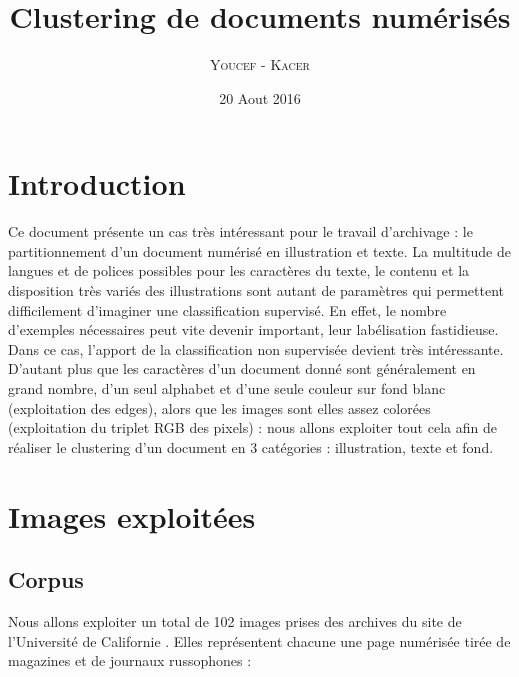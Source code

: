 \documentclass{book}
\title{Clustering de documents numérisés}
\author{\textsc{Youcef} - \textsc{Kacer}}
\date{20 Aout 2016}
\begin{document}
 
\maketitle

\tableofcontents

\frontmatter
\chapter{Introduction}
Ce document présente un cas très intéressant pour le travail d'archivage : le partitionnement d'un document numérisé en illustration et texte.
La multitude de langues et de polices possibles pour les caractères du texte, le contenu et la disposition très variés des illustrations sont 
autant de paramètres qui permettent difficilement d'imaginer une classification supervisé. En effet, le nombre d'exemples nécessaires peut vite devenir important,
leur labélisation fastidieuse.\\
Dans ce cas, l'apport de la classification non supervisée devient très intéressante. D'autant plus que les caractères d'un document donné sont généralement en grand 
nombre, d'un seul alphabet et d'une seule couleur sur fond blanc (exploitation des edges), alors que les images sont elles assez colorées (exploitation du triplet 
RGB des pixels) : nous allons exploiter tout cela afin de réaliser le clustering d'un document en 3 catégories : illustration, texte et fond.


\mainmatter
\chapter{Images exploitées}
\section{Corpus}\label{labelisation}
Nous allons exploiter un total de 102 images prises des archives du site de l'Université de Californie \cite{uci}. 
Elles représentent chacune une page numérisée tirée de magazines et de journaux russophones \cite{dataset} :
\end{document}

